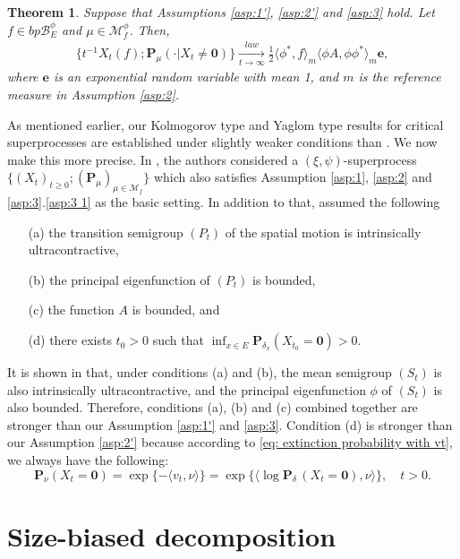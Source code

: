\documentclass[UTF8]{pkuthss}
\theoremstyle{plain}
\newtheorem{thm}{Theorem}[section]
\theoremstyle{definition}
\numberwithin{equation}{section}
\begin{document}
\begin{thm}\label{thm:Yaglom-type-theorem}
	Suppose that Assumptions  \ref{asp:1'}, \ref{asp:2'} and \ref{asp:3} hold.
	Let $f\in bp\mathscr B^\phi_E$ and $\mu\in\mathcal M^\phi_f$.
	Then,
\begin{align}
	\big\{t^{-1}X_t(f);\mathbf P_\mu(\cdot | X_t\neq \mathbf 0)\big\}
	\xrightarrow[t\to\infty]{law} \frac{1}{2}\langle \phi^*, f\rangle_m\langle \phi A, \phi\phi^*\rangle_m \mathbf e,
\end{align}
	where $\mathbf e$ is an exponential random variable with mean 1,
 and $m$ is the reference measure  in Assumption \ref{asp:2}.
\end{thm}

	As mentioned earlier, our Kolmogorov type and Yaglom type results for critical superprocesses are established under slightly weaker conditions than \cite{RenSongZhang2015Limit}.
We now make this more precise.
	In \cite{RenSongZhang2015Limit}, the authors considered a $(\xi,\psi)$-superprocess $\{(X_t)_{t\geq 0}; (\mathbf P_\mu)_{\mu \in \mathcal M_f}\}$ which also satisfies Assumption \ref{asp:1}, \ref{asp:2} and \ref{asp:3}.\eqref{asp:3 1} as the basic setting. In addition to that, \cite{RenSongZhang2015Limit} assumed the following
\begin{itemize}
\item[(a)]
	the transition semigroup $(P_t)$ of the spatial motion is intrinsically ultracontractive,
\item[(b)]
	the principal eigenfunction of $(P_t)$ is bounded,
\item[(c)]
	the function $A$ is bounded, and
\item[(d)]
	there exists $t_0>0$ such that $\inf_{x\in E} \mathbf P_{\delta_x}(X_{t_0}= \mathbf 0)>0$.
\end{itemize}
It is shown in \cite{RenSongZhang2015Limit} that, under conditions (a) and (b), the mean semigroup $(S_t)$ is also intrinsically ultracontractive, and the principal eigenfunction $\phi$ of $(S_t)$ is also bounded. Therefore, conditions (a), (b) and (c) combined together are stronger than our Assumption \ref{asp:1'} and \ref{asp:3}. Condition (d) is stronger than our Assumption \ref{asp:2'} because according to \eqref{eq: extinction probability with vt}, we always have the following:
\[
	\mathbf P_\nu(X_t  = \mathbf 0) = \exp\{-\langle v_t,\nu \rangle\} = \exp\{\langle \log \mathbf P_{\delta_\cdot}(X_t = \mathbf 0),\nu \rangle\},\quad t>0.
\]



\section{Size-biased decomposition}
\end{document}
